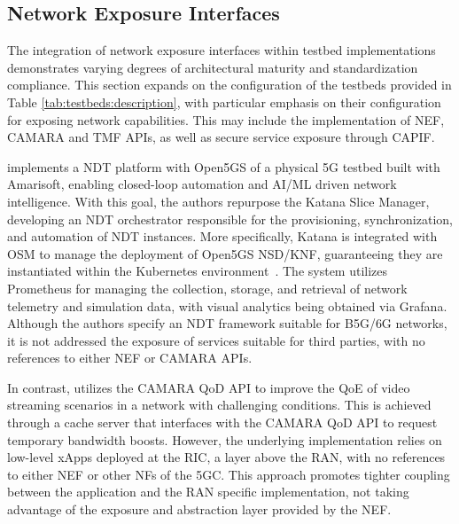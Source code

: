 \subsection{Network Exposure Interfaces} \label{sec:testbeds:5GC:5GC}

The integration of network exposure interfaces within testbed implementations demonstrates varying degrees of architectural maturity and standardization compliance. This section expands on the configuration of the testbeds provided in Table \ref{tab:testbeds:description}, with particular emphasis on their configuration for exposing network capabilities. This may include the implementation of \acs{NEF}, CAMARA and \acs{TMF} \acsp{API}, as well as secure service exposure through \acs{CAPIF}.

\citet{DesignAndEvaluationNetworkDigitalTwin} implements a \acf{NDT} platform with Open5GS of a physical \acs{5G} testbed built with Amarisoft, enabling closed-loop automation and \acs{AI}/\acs{ML} driven network intelligence. With this goal, the authors repurpose the Katana Slice Manager, developing an \acs{NDT} orchestrator responsible for the provisioning, synchronization, and automation of \acs{NDT} instances. More specifically, Katana is integrated with \acs{OSM} to manage the deployment of Open5GS \acs{NSD}/\acs{KNF}, guaranteeing they are instantiated within the Kubernetes environment~\cite{videoNDTDemokritos}. The system utilizes Prometheus for managing the collection, storage, and retrieval of network telemetry and simulation data, with visual analytics being obtained via Grafana. Although the authors specify an \acs{NDT} framework suitable for \acs{B5G}/\acs{6G} networks, it is not addressed the exposure of services suitable for third parties, with no references to either \acs{NEF} or CAMARA \acsp{API}.

In contrast, \citet{BenefitsCaveatsQoDNetworkAPIsVideoStreaming} utilizes the CAMARA \acs{QoD} \acs{API} to improve the \acs{QoE} of video streaming scenarios in a network with challenging conditions. This is achieved through a cache server that interfaces with the CAMARA \acs{QoD} \acs{API} to request temporary bandwidth boosts. However, the underlying implementation relies on low-level xApps deployed at the \acs{RIC}, a layer above the \acs{RAN}, with no references to either \acs{NEF} or other \acsp{NF} of the \acs{5GC}. This approach promotes tighter coupling between the application and the \acs{RAN} specific implementation, not taking advantage of the exposure and abstraction layer provided by the \acs{NEF}.

